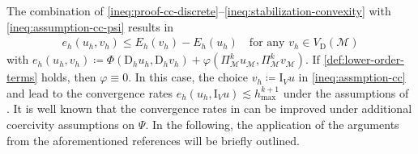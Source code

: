 \documentclass[a4paper]{amsart}
\numberwithin{equation}{section}
\newcommand{\I}{\mathrm{I}}
\newcommand{\Mcal}{\mathcal{M}}
\newcommand{\D}{\mathrm{D}}
\theoremstyle{remark}
\begin{document}
The combination of \eqref{ineq:proof-cc-discrete}--\eqref{ineq:stabilization-convexity} with \eqref{ineq:assumption-cc-psi}
results in
\begin{align}\label{ineq:assmption-cc}
	e_h(u_h,v_h) \leq E_h(v_h) - E_h(u_h) \quad\text{for any } v_h \in V_\mathrm{D}(\Mcal)
\end{align}
with $e_h(u_h,v_h) \coloneqq \Phi(\D_h u_h, \D_h v_h) + \varphi(\Pi_\Mcal^k u_\Mcal, \Pi_\Mcal^k v_\Mcal)$.
If \eqref{def:lower-order-terms} holds, then $\varphi \equiv 0$.
In this case, the choice $v_h \coloneqq \I_V u$ in \eqref{ineq:assmption-cc} and  lead to the convergence rates $e_h(u_h,\I_V u) \lesssim h_{\max}^{k+1}$ under the assumptions of .
It is well known \cite{GlowinskiMarrocco1975,Tyukhtin1982,Chow1989} that the convergence rates in  can be improved under additional coercivity assumptions on $\Psi$.
In the following, the application of the arguments from the aforementioned references will be briefly outlined.
\end{document}
